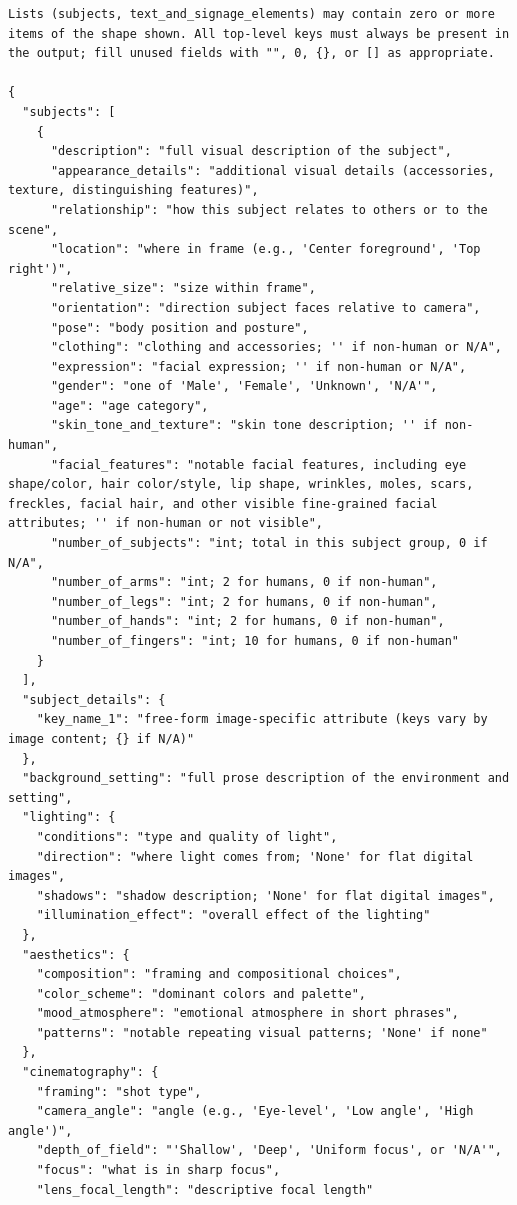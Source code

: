 \documentclass{llmxive}
\begin{document}
\begin{tcolorbox}
\begin{Verbatim}[breaklines=true,breakanywhere=true,fontsize=\scriptsize]
Lists (subjects, text_and_signage_elements) may contain zero or more items of the shape shown. All top-level keys must always be present in the output; fill unused fields with "", 0, {}, or [] as appropriate.

{
  "subjects": [
    {
      "description": "full visual description of the subject",
      "appearance_details": "additional visual details (accessories, texture, distinguishing features)",
      "relationship": "how this subject relates to others or to the scene",
      "location": "where in frame (e.g., 'Center foreground', 'Top right')",
      "relative_size": "size within frame",
      "orientation": "direction subject faces relative to camera",
      "pose": "body position and posture",
      "clothing": "clothing and accessories; '' if non-human or N/A",
      "expression": "facial expression; '' if non-human or N/A",
      "gender": "one of 'Male', 'Female', 'Unknown', 'N/A'",
      "age": "age category",
      "skin_tone_and_texture": "skin tone description; '' if non-human",
      "facial_features": "notable facial features, including eye shape/color, hair color/style, lip shape, wrinkles, moles, scars, freckles, facial hair, and other visible fine-grained facial attributes; '' if non-human or not visible",
      "number_of_subjects": "int; total in this subject group, 0 if N/A",
      "number_of_arms": "int; 2 for humans, 0 if non-human",
      "number_of_legs": "int; 2 for humans, 0 if non-human",
      "number_of_hands": "int; 2 for humans, 0 if non-human",
      "number_of_fingers": "int; 10 for humans, 0 if non-human"
    }
  ],
  "subject_details": {
    "key_name_1": "free-form image-specific attribute (keys vary by image content; {} if N/A)"
  },
  "background_setting": "full prose description of the environment and setting",
  "lighting": {
    "conditions": "type and quality of light",
    "direction": "where light comes from; 'None' for flat digital images",
    "shadows": "shadow description; 'None' for flat digital images",
    "illumination_effect": "overall effect of the lighting"
  },
  "aesthetics": {
    "composition": "framing and compositional choices",
    "color_scheme": "dominant colors and palette",
    "mood_atmosphere": "emotional atmosphere in short phrases",
    "patterns": "notable repeating visual patterns; 'None' if none"
  },
  "cinematography": {
    "framing": "shot type",
    "camera_angle": "angle (e.g., 'Eye-level', 'Low angle', 'High angle')",
    "depth_of_field": "'Shallow', 'Deep', 'Uniform focus', or 'N/A'",
    "focus": "what is in sharp focus",
    "lens_focal_length": "descriptive focal length"

\end{Verbatim}
\end{tcolorbox}
\end{document}

